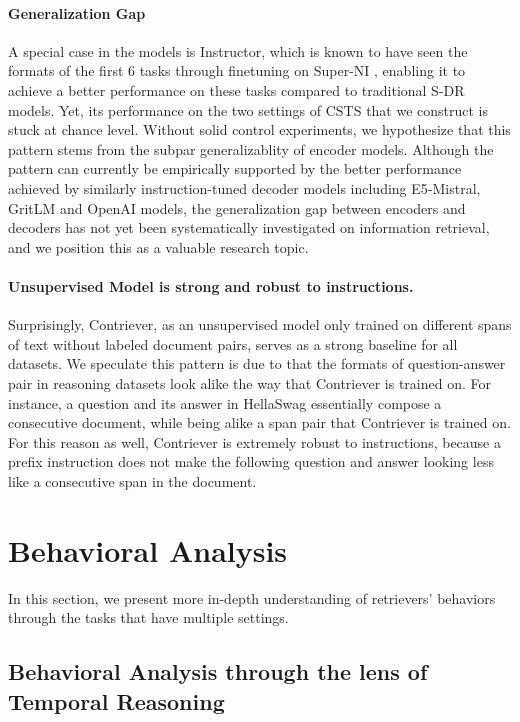 \documentclass{article} %
\begin{document}
\paragraph{Generalization Gap} A special case in the models is Instructor, which is known to have seen the formats of the first 6 tasks through finetuning on Super-NI \citep{wang2022super}, enabling it to achieve a better performance on these tasks compared to traditional S-DR models. Yet, its performance on the two settings of CSTS that we construct is stuck at chance level. Without solid control experiments, we hypothesize that this pattern stems from the subpar generalizablity of encoder models. Although the pattern can currently be empirically supported by the better performance achieved by similarly instruction-tuned decoder models including E5-Mistral, GritLM and OpenAI models, the generalization gap between encoders and decoders has not yet been systematically investigated on information retrieval, and we position this as a valuable research topic.

\paragraph{Unsupervised Model is strong and robust to instructions.} Surprisingly, Contriever, as an unsupervised model only trained on different spans of text without labeled document pairs, serves as a strong baseline for all datasets. We speculate this pattern is due to that the formats of question-answer pair in reasoning datasets look alike the way that Contriever is trained on. For instance, a question and its answer in HellaSwag essentially compose a consecutive document, while being alike a span pair that Contriever is trained on. For this reason as well, Contriever is extremely robust to instructions, because a prefix instruction does not make the following question and answer looking less like a consecutive span in the document.

% 

\section{Behavioral Analysis}

In this section, we present more in-depth understanding of retrievers' behaviors through the tasks that have multiple settings.

\subsection{Behavioral Analysis through the lens of Temporal Reasoning}
\label{subsec: temp reason}
\end{document}
